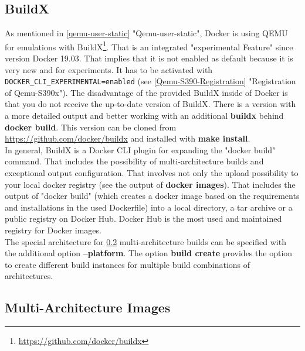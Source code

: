 \subsection{BuildX}\label{BuildX}

As mentioned in \ref{qemu-user-static} "Qemu-user-static", Docker is using QEMU for emulations with BuildX\footnote{\url{https://github.com/docker/buildx}}. That is an integrated "experimental Feature" since version Docker 19.03. That implies that it is not enabled as default because it is very new and for experiments. It has to be activated with \lstinline!DOCKER_CLI_EXPERIMENTAL=enabled! (see \ref{Qemu-S390-Registration} "Registration of Qemu-S390x"). The disadvantage of the provided BuildX inside of Docker is that you do not receive the up-to-date version of BuildX. There is a version with a more detailed output and better working with an additional \textbf{buildx} behind \textbf{docker build}. This version can be cloned from \url{https://github.com/docker/buildx} and installed with \textbf{make install}. \\
In general, BuildX is a Docker CLI plugin for expanding the "docker build" command. That includes the possibility of multi-architecture builds and exceptional output configuration. That involves not only the upload possibility to your local docker registry (see the output of \textbf{docker images}). That includes the output of "docker build" (which creates a docker image based on the requirements and installations in the used Dockerfile) into a local directory, a tar archive or a public registry on Docker Hub. Docker Hub is the most used and maintained registry for Docker images. \\
The special architecture for \ref{MultiArchitectureImages} multi-architecture builds can be specified with the additional option \textbf{--platform}.
The option \textbf{build create} provides the option to create different build instances for multiple build combinations of architectures.

\subsection{Multi-Architecture Images}\label{MultiArchitectureImages}

